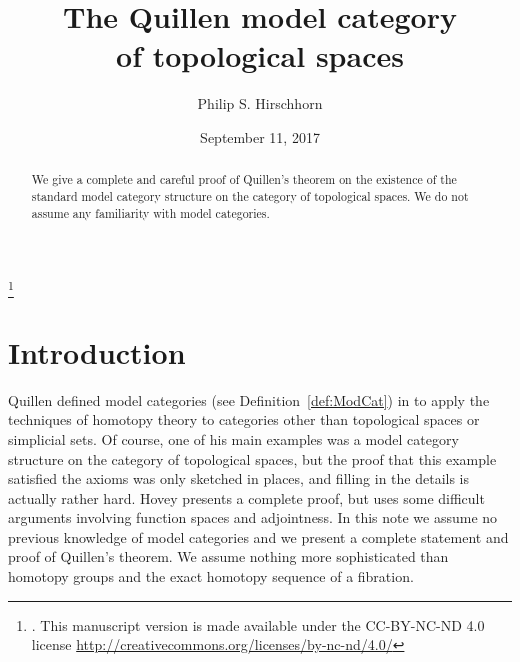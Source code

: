 \documentclass{amsart}
\numberwithin{equation}{section}
\theoremstyle{slplain}
\theoremstyle{definition}
\theoremstyle{remark}
\newcommand{\defref}{Definition~\ref}
\begin{document}
\title[The Quillen model category of topological spaces]{The Quillen
  model category\\of topological spaces}

\author{Philip S. Hirschhorn}

\address{Department of Mathematics\\
  Wellesley College\\
  106 Central Street\\
  Wellesley, Massachusetts 02481}



\begin{abstract}
  We give a complete and careful proof of Quillen's theorem on the
  existence of the standard model category structure on the category
  of topological spaces. We do not assume any familiarity with model
  categories.
\end{abstract}

\thanks{. This manuscript version is made available
  under the CC-BY-NC-ND 4.0 license
  \url{http://creativecommons.org/licenses/by-nc-nd/4.0/}}



\date{September 11, 2017}

\maketitle

\tableofcontents

\section{Introduction}
\label{sec:Intro}

Quillen defined model categories (see \defref{def:ModCat}) in
\cites{Q:HomAlg,Q:RHT} to apply the techniques of homotopy theory to
categories other than topological spaces or simplicial sets.  Of
course, one of his main examples was a model category structure on the
category of topological spaces, but the proof that this example
satisfied the axioms was only sketched in places, and filling in the
details is actually rather hard.  Hovey \cite{Hovey:MC} presents a
complete proof, but uses some difficult arguments involving function
spaces and adjointness.  In this note we assume no previous knowledge
of model categories and we present a complete statement and proof of
Quillen's theorem.  We assume nothing more sophisticated than homotopy
groups and the exact homotopy sequence of a fibration.
\end{document}
